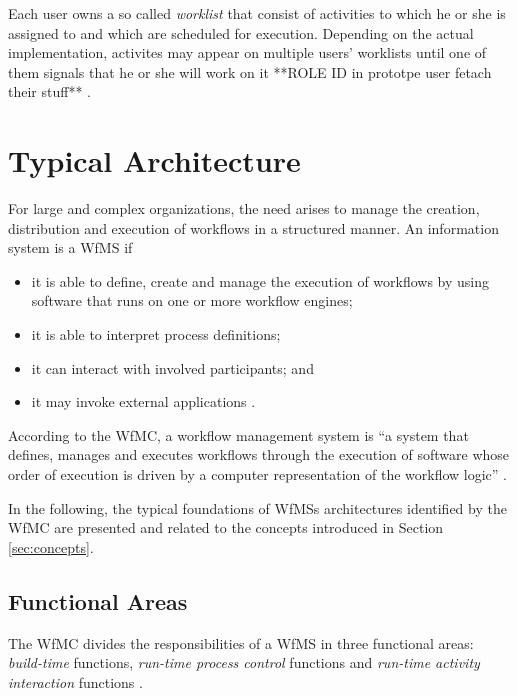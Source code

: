     Each user owns a so called \emph{worklist} that consist of activities to which he or she is assigned to and which are scheduled for execution. Depending on the actual implementation, activites may appear on multiple users' worklists until one of them signals that he or she will work on it **ROLE ID in prototpe user fetach their stuff** \cite{Hollingsworth1995WfMC,Casati1999Specification}.


\section{Typical Architecture} %
\label{sec:typical_architecture}
  For large and complex organizations, the need arises to manage the creation, distribution and execution of workflows in a structured manner. An information system is a \ac{WfMS} if
  \begin{itemize}[nosep]
    \item it is able to define, create and manage the execution of workflows by using software that runs on one or more workflow engines;
    \item it is able to interpret process definitions;
    \item it can interact with involved participants; and
    \item it may invoke external applications \cite{Lawrence1997Workflow}.
  \end{itemize}

  According to the \ac{WfMC}, a workflow management system is ``a system that defines, manages and executes workflows through the execution of software whose order of execution is driven by a computer representation of the workflow logic'' \cite{Hollingsworth1995WfMC}.

  In the following, the typical foundations of \acp{WfMS} architectures identified by the \ac{WfMC} are presented and related to the concepts introduced in Section \ref{sec:concepts}.

  \subsection{Functional Areas} %
  \label{sub:functional_areas}
    The \ac{WfMC} divides the responsibilities of a \ac{WfMS} in three functional areas: \emph{build-time} functions, \emph{run-time process control} functions and \emph{run-time activity interaction} functions \cite{Hollingsworth1995WfMC, Alonso1997Functionality}.

